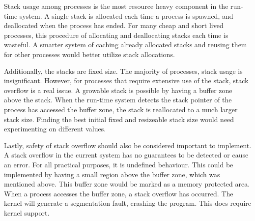 Stack usage among processes is the most resource heavy component in the run\hyp{}time system. A single stack is allocated each time a process is spawned, and deallocated when the process has ended. For many cheap and short lived processes, this procedure of allocating and deallocating stacks each time is wasteful. A smarter system of caching already allocated stacks and reusing them for other processes would better utilize stack allocations.

Additionally, the stacks are fixed size. The majority of processes, stack usage is insignificant. However, for processes that require extensive use of the stack, stack overflow is a real issue. A growable stack is possible by having a buffer zone above the stack. When the run\hyp{}time system detects the stack pointer of the process has accessed the buffer zone, the stack is reallocated to a much larger stack size. Finding the best initial fixed and resizeable stack size would need experimenting on different values.

Lastly, safety of stack overflow should also be considered important to implement. A stack overflow in the current system has no guarantees to be detected or cause an error. For all practical purposes, it is undefined behaviour. This could be implemented by having a small region above the buffer zone, which was mentioned above. This buffer zone would be marked as a memory protected area. When a process accesses the buffer zone, a stack overflow has occurred. The kernel will generate a segmentation fault, crashing the program. This does require kernel support.
